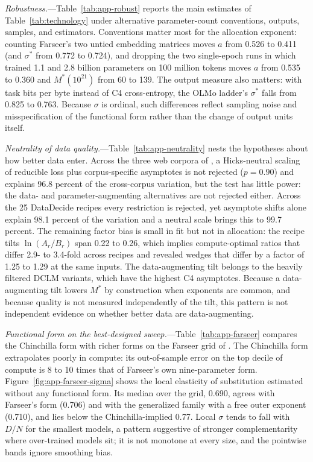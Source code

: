 \emph{Robustness.}---Table~\ref{tab:app-robust} reports the main estimates of Table~\ref{tab:technology} under
alternative parameter-count conventions, outputs, samples, and estimators. Conventions matter most for the allocation
exponent: counting Farseer's two untied embedding matrices moves $a$ from 0.526 to 0.411 (and $\sigma^*$ from 0.772 to
0.724), and dropping the two single-epoch runs in which \citet{muennighoff2023scaling} trained 1.1 and 2.8 billion
parameters on 100 million tokens moves $a$ from 0.535 to 0.360 and $M^*(10^{21})$ from 60 to 139. The output measure
also matters: with task bits per byte instead of C4 cross-entropy, the OLMo ladder's $\sigma^*$ falls from 0.825 to
0.763. Because $\sigma$ is ordinal, such differences reflect sampling noise and misspecification of the functional
form rather than the change of output units itself.

\emph{Neutrality of data quality.}---Table~\ref{tab:app-neutrality} nests the hypotheses about how better data enter.
Across the three web corpora of \citet{gadre2024language}, a Hicks-neutral scaling of reducible loss plus
corpus-specific asymptotes is not rejected ($p=0.90$) and explains 96.8 percent of the cross-corpus variation, but the
test has little power: the data- and parameter-augmenting alternatives are not rejected either. Across the 25
DataDecide recipes \citep{magnusson2025datadecide} every restriction is rejected, yet asymptote shifts alone explain
98.1 percent of the variation and a neutral scale brings this to 99.7 percent. The remaining factor bias is small in fit
but not in allocation: the recipe tilts $\ln(A_r/B_r)$ span 0.22 to 0.26, which implies compute-optimal ratios that
differ 2.9- to 3.4-fold across recipes and revealed wedges that differ by a factor of 1.25 to 1.29 at the same inputs.
The data-augmenting tilt belongs to the heavily filtered DCLM variants, which have the highest C4 asymptotes. Because
a data-augmenting tilt lowers $M^*$ by construction when exponents are common, and because quality is not measured
independently of the tilt, this pattern is not independent evidence on whether better data are data-augmenting.

\emph{Functional form on the best-designed sweep.}---Table~\ref{tab:app-farseer} compares the Chinchilla form with
richer forms on the Farseer grid of \citet{li2025predictableb}. The Chinchilla form extrapolates poorly in compute:
its out-of-sample error on the top decile of compute is 8 to 10 times that of Farseer's own nine-parameter form.
Figure~\ref{fig:app-farseer-sigma} shows the local elasticity of substitution estimated without any functional form.
Its median over the grid, 0.690, agrees with Farseer's form (0.706) and with the generalized family with a free outer
exponent (0.710), and lies below the Chinchilla-implied 0.77. Local $\sigma$ tends to fall with $D/N$ for the smallest
models, a pattern suggestive of stronger complementarity where over-trained models sit; it is not monotone at every
size, and the pointwise bands ignore smoothing bias.

